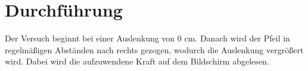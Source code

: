 \section{Durchführung}
\label{sec:Durchführung}
Der Versuch beginnt bei einer Auslenkung von 0 cm. Danach wird der Pfeil 
in regelmäßigen Abständen nach rechts gezogen, wodurch die Auslenkung 
vergrößert wird. Dabei wird die aufzuwendene Kraft auf dem  Bildschirm abgelesen. 